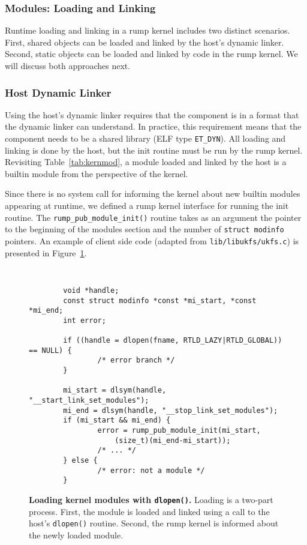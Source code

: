 \subsubsection{Modules: Loading and Linking}

Runtime loading and linking in a rump kernel includes two distinct
scenarios.  First, shared objects can be loaded and linked by the
host's dynamic linker.  Second, static objects can be loaded and
linked by code in the rump kernel.  We will discuss both approaches
next.

\subsubsection*{Host Dynamic Linker}

Using the host's dynamic linker requires that the component is in
a format that the dynamic linker can understand.  In practice, this
requirement means that the component needs to be a shared library
(ELF type \verb+ET_DYN+).  All loading and linking is done by the
host, but the init routine must be run by the rump kernel.  Revisiting
Table~\ref{tab:kernmod}, a module loaded and linked by the host is a
builtin module from the perspective of the kernel.

Since there is no system call for informing the kernel about new
builtin modules appearing at runtime, we defined a rump kernel
interface for running the init routine.  The \verb+rump_pub_module_init()+
routine takes as an argument the pointer to the beginning of the modules
section and the number of \texttt{struct modinfo} pointers.
An example of client side code (adapted from \texttt{lib/libukfs/ukfs.c})
is presented in Figure~\ref{fig:dlopen}.

\begin{figure}[t]
{\tt \scriptsize  
\begin{verbatim}
        void *handle;
        const struct modinfo *const *mi_start, *const *mi_end;
        int error;

        if ((handle = dlopen(fname, RTLD_LAZY|RTLD_GLOBAL)) == NULL) {
                /* error branch */
        }

        mi_start = dlsym(handle, "__start_link_set_modules");
        mi_end = dlsym(handle, "__stop_link_set_modules");
        if (mi_start && mi_end) {
                error = rump_pub_module_init(mi_start,
                    (size_t)(mi_end-mi_start));
                /* ... */
        } else {
                /* error: not a module */
        }
\end{verbatim}}
\caption[Loading kernel modules with \texttt{dlopen()}]{
\textbf{Loading kernel modules with \texttt{dlopen()}.}
Loading is a two-part process.  First, the module is loaded and linked
using a call to the host's \texttt{dlopen()} routine.  Second, the
rump kernel is informed about the newly loaded module.
}
\label{fig:dlopen}
\end{figure}

